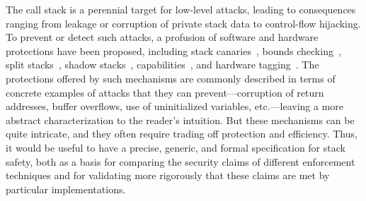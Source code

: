 \documentclass[acmsmall,review,anonymous]{acmart}\settopmatter{printfolios=true,printccs=false,printacmref=false}
\begin{document}
The call stack is a perennial target for low-level attacks, leading to
consequences ranging from leakage or corruption of private stack data to
control-flow hijacking. To prevent or detect such attacks, a profusion of
software and hardware protections have been proposed,
%
including stack canaries~\citep{Cowan+98},
bounds checking~\citep{NagarakatteZMZ09,NagarakatteZMZ10,DeviettiBMZ08},
split stacks~\citep{Kuznetsov+14},
shadow stacks~\citep{Dang+15,Shanbhogue+19},
capabilities~\citep{Woodruff+14,Chisnall+15,Skorstengaard+19,Skorstengaard+19b,Tsampas+19,Georges+21},
and hardware tagging~\citep{DBLP:conf/sp/RoesslerD18}. \ifaftersubmission{}
\fi
%
The protections offered by such mechanisms are commonly described in terms
of concrete examples of attacks that they can prevent---corruption
of return addresses, buffer overflows, use of uninitialized variables,
etc.---leaving a more abstract characterization to the reader's intuition.
But these mechanisms can be quite intricate,
and they often require trading off protection and efficiency.
Thus, it would be useful to have a precise, generic, and formal
specification for stack
safety, both as a basis for comparing the security claims of different
enforcement techniques and for validating more rigorously that these claims
are met by particular implementations.
\end{document}
